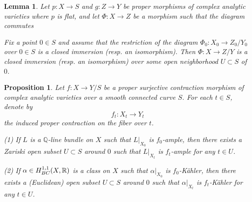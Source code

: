 \documentclass[10pt,a4paper]{amsart}
\newtheorem{lemma}{Lemma}
\newtheorem{proposition}{Proposition}
\newcommand{\R}{\mathbb R}
\begin{document}
\begin{lemma}\label{ResEmbed}
Let $p:X \to S$ and $g:Z \to  Y$ be proper morphisms of complex analytic varieties where $p$ is flat, and let $\Phi: X\to Z$ be a morphism such that the diagram commutes 
\begin{center}
\end{center}
Fix a point $0\in S$ and assume that the restriction of the diagram $\Phi_0: X_0 \rightarrow Z_0/Y_0$ over $0\in S$ is a closed immersion (resp. an isomorphism). Then $\Phi:X\to Z /Y$ is a closed immersion (resp. an isomorphism) over some open neighborhood $U\subset S$ of $0$. 
\end{lemma}

\begin{proposition}\label{DefAmple}
Let $f: X \to Y/S$ be a proper surjective contraction morphism of complex analytic varieties over a smooth connected curve $S$. For each $t \in S$, denote by
\[
f_t : X_t \to Y_t
\]
the induced proper contraction on the fiber over $t$. 

(1) If $L$ is a $\mathbb{Q}$-line bundle on $X$ such that $L|_{X_0}$ is $f_0$-ample, then there exists a Zariski open subset $U \subset S$ around $0$ such that $L|_{X_t}$ is $f_t$-ample for any $t \in U$.

(2) If $\alpha\in H^{1,1}_{\rm{BC}}(X, \R)$ is a class on $X$ such that $\alpha|_{X_0}$ is $f_0$-K\"ahler, then there exists a (Euclidean) open subset $U\subset S$ around $0$ such that $\alpha|_{X_t}$ is $f_t$-K\"ahler for any $t\in U$. 
\end{proposition}
\end{document}
